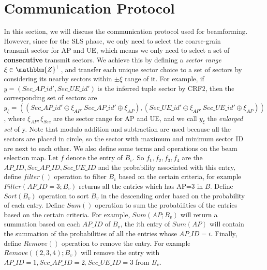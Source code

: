\documentclass[conference]{IEEEtran}
\begin{document}
\section{Communication Protocol}
In this section, we will discuss the communication protocol used for beamforming. However, since for the SLS phase, we only need to select the coarse-grain transmit sector for AP and UE, which means we only need to select a set of \textbf{consecutive} transmit sectors. We achieve this by defining a \emph{sector range} $\xi\in \mathbbm{Z}^+$, and transfer each unique sector choice to a set of sectors by considering its nearby sectors within $\pm \xi$ range of it. For example, if $y = (Sec\_AP\_id', Sec\_UE\_id')$ is the inferred tuple sector by CRF2, then the corresponding set of sectors are $y_{\xi} = ((Sec\_AP\_id'\ominus \xi_{AP}, Sec\_AP\_id'\oplus \xi_{AP}), (Sec\_UE\_id'\ominus \xi_{AP}, Sec\_UE\_id'\oplus \xi_{AP}))$, where $\xi_{AP},\xi_{Sec}$ are the sector range for AP and UE, and we call $y_{\xi}$ the \emph{enlarged set} of y. Note that modulo addition and subtraction are used because all the sectors are placed in circle, so the sector with maximum and minimum sector ID are next to each other. 
We also define some terms and operations on the beam selection map. Let $f$ denote the entry of $B_{v}$. So $f_{1},f_{2},f_{3},f_{4}$ are the $AP\_ID, Sec\_AP\_ID, Sec\_UE\_ID$ and the probability associated with this entry, define $filter()$ operation to filter $B_{v}$ based on the certain criteria, for example $Filter(AP\_ID=3;B_{v})$ returns all the entries which has AP=3 in $B$. Define  $Sort(B_{v})$ operation to sort $B_{v}$ in the descending order based on the probability of each entry. Define $Sum()$ operation to sum the probabilities of the entries based on the certain criteria. For example, $Sum(AP;B_{v})$ will return a summation based on each $AP\_ID$ of $B_{v}$, the ith entry of $Sum(AP)$ will contain the summation of the probabilities of all the entries whose $AP\_ID=i$. Finally, define $Remove()$ operation to remove the entry. For example $Remove((2, 3, 4);B_{v})$ will remove the entry with $AP\_ID=1,Sec\_AP\_ID = 2, Sec\_UE\_ID=3$ from $B_{v}$.
\end{document}
